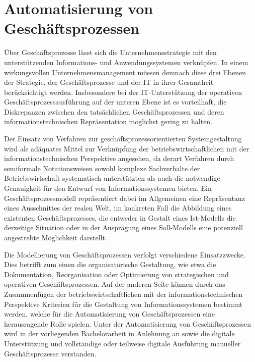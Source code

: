 \section{Automatisierung von Geschäftsprozessen}\label{sec:Automatisierung}
Über Geschäftsprozesse lässt sich die Unternehmensstrategie mit den unterstützenden Informations- und Anwendungssystemen verknüpfen.
In einem wirkungsvollen Unternehmensmanagement müssen demnach diese drei Ebenen der Strategie, der Geschäftsprozesse und der \ac{IT} in ihrer Gesamtheit berücksichtigt werden.
\cite{Scheer.1991}
Insbesondere bei der \ac{IT}-Unterstützung der operativen Geschäftsprozessausführung auf der unteren Ebene ist es vorteilhaft, die Diskrepanzen zwischen den tatsächlichen Geschäftsprozessen und deren informationstechnischen Repräsentation möglichst gering zu halten.
\cite{Gadatsch.2013}

Der Einsatz von Verfahren zur geschäftsprozessorientierten Systemgestaltung wird als adäquates Mittel zur Verknüpfung der betriebswirtschaftlichen mit der informationstechnischen Perspektive angesehen, da derart Verfahren durch semiformale Notationsweisen sowohl komplexe Sachverhalte der Betriebswirtschaft systematisch unterstützten als auch die notwendige Genauigkeit für den Entwurf von Informationssystemen bieten.
\cite{Staud.2006}
Ein Geschäftsprozessmodell repräsentiert dabei im Allgemeinen eine Repräsentanz eines Ausschnittes der realen Welt, im konkreten Fall die Abbildung eines existenten Geschäftsprozesses, die entweder in Gestalt eines Ist-Modells die derzeitige Situation oder in der Ausprägung eines Soll-Modells eine potenziell angestrebte Möglichkeit darstellt.
\cite{Becker.2012}

Die Modellierung von Geschäftsprozessen verfolgt verschiedene Einsatzzwecke.
Dies betrifft zum einen die organisatorische Gestaltung, wie etwa die Dokumentation, Reorganisation oder Optimierung von strategischen und operativen Geschäftsprozessen. 
Auf der anderen Seite können durch das Zusammenfügen der betriebswirtschaftlichen mit der informationstechnischen Perspektive Kriterien für die Gestaltung von Informationssystemen bestimmt werden, welche für die Automatisierung von Geschäftsprozessen eine herausragende Rolle spielen.
\cite{Scheer.2017}
Unter der Automatisierung von Geschäftsprozessen wird in der vorliegenden Bachelorarbeit in Anlehnung an \citeauthor{Abolhassan.2016} \cite{Abolhassan.2016} sowie \citeauthor{Jobst.2010} \cite{Jobst.2010} die digitale Unterstützung und vollständige oder teilweise digitale Ausführung manueller Geschäftsprozesse verstanden.

